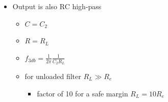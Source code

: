 \documentclass[beamer]{standalone}
\begin{document}
{\begin{columns}[t]
\begin{column}
\begin{itemize}
\begin{itemize}
\begin{itemize}
						\end{itemize}
				\end{itemize}
			\item<3-> Output is also RC high-pass
				\begin{itemize}
					\item $C=C_2$
					\item $R=R_L$
					\item $f_{3db}=\frac{1}{2 \pi} \frac{1}{C_2 R_L}$
					\item for unloaded filter $R_L \gg R_e$ 
						\begin{itemize}
							\item factor of 10 for a safe margin
								$R_L = 10 R_e$
						\end{itemize}
				\end{itemize}
		\end{itemize}
	\end{column}
\end{columns}
	
	}
	
\end{document}
